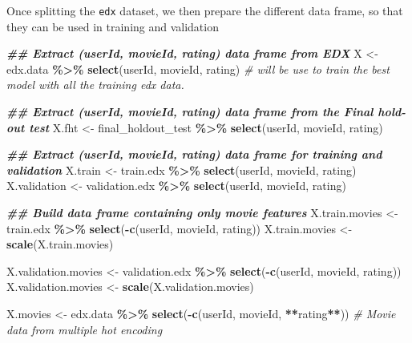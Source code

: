 \documentclass[
]{article}
\newenvironment{Shaded}{\begin{snugshade}}{\end{snugshade}}
\newcommand{\CommentTok}[1]{\textcolor[rgb]{0.56,0.35,0.01}{\textit{#1}}}
\newcommand{\DocumentationTok}[1]{\textcolor[rgb]{0.56,0.35,0.01}{\textbf{\textit{#1}}}}
\newcommand{\FunctionTok}[1]{\textcolor[rgb]{0.13,0.29,0.53}{\textbf{#1}}}
\newcommand{\NormalTok}[1]{#1}
\newcommand{\OtherTok}[1]{\textcolor[rgb]{0.56,0.35,0.01}{#1}}
\newcommand{\SpecialCharTok}[1]{\textcolor[rgb]{0.81,0.36,0.00}{\textbf{#1}}}
\begin{document}
Once splitting the \texttt{edx} dataset, we then prepare the different
data frame, so that they can be used in training and validation

\begin{Shaded}
\begin{Highlighting}[]
\DocumentationTok{\#\# Extract (userId, movieId, rating) data frame from EDX}
\NormalTok{X }\OtherTok{\textless{}{-}}\NormalTok{ edx.data }\SpecialCharTok{\%\textgreater{}\%} \FunctionTok{select}\NormalTok{(userId, movieId, rating) }\CommentTok{\# will be use to train the best model with all the training \textasciigrave{}edx\textasciigrave{} data.}

\DocumentationTok{\#\# Extract (userId, movieId, rating) data frame from the Final hold{-}out test}
\NormalTok{X.fht }\OtherTok{\textless{}{-}}\NormalTok{ final\_holdout\_test }\SpecialCharTok{\%\textgreater{}\%} \FunctionTok{select}\NormalTok{(userId, movieId, rating)}

\DocumentationTok{\#\# Extract (userId, movieId, rating) data frame for training and validation}
\NormalTok{X.train }\OtherTok{\textless{}{-}}\NormalTok{ train.edx }\SpecialCharTok{\%\textgreater{}\%} \FunctionTok{select}\NormalTok{(userId, movieId, rating)}
\NormalTok{X.validation }\OtherTok{\textless{}{-}}\NormalTok{ validation.edx }\SpecialCharTok{\%\textgreater{}\%} \FunctionTok{select}\NormalTok{(userId, movieId, rating)}

\DocumentationTok{\#\# Build data frame containing only movie features}
\NormalTok{X.train.movies }\OtherTok{\textless{}{-}}\NormalTok{ train.edx }\SpecialCharTok{\%\textgreater{}\%} \FunctionTok{select}\NormalTok{(}\SpecialCharTok{{-}}\FunctionTok{c}\NormalTok{(userId, movieId, rating))}
\NormalTok{X.train.movies }\OtherTok{\textless{}{-}} \FunctionTok{scale}\NormalTok{(X.train.movies)}

\NormalTok{X.validation.movies }\OtherTok{\textless{}{-}}\NormalTok{ validation.edx }\SpecialCharTok{\%\textgreater{}\%} \FunctionTok{select}\NormalTok{(}\SpecialCharTok{{-}}\FunctionTok{c}\NormalTok{(userId, movieId, rating))}
\NormalTok{X.validation.movies }\OtherTok{\textless{}{-}} \FunctionTok{scale}\NormalTok{(X.validation.movies)}

\NormalTok{X.movies }\OtherTok{\textless{}{-}}\NormalTok{ edx.data }\SpecialCharTok{\%\textgreater{}\%} \FunctionTok{select}\NormalTok{(}\SpecialCharTok{{-}}\FunctionTok{c}\NormalTok{(userId, movieId, }\SpecialCharTok{**}\NormalTok{rating}\SpecialCharTok{**}\NormalTok{)) }\CommentTok{\# Movie data from multiple hot encoding}
\end{Highlighting}
\end{Shaded}
\end{document}
